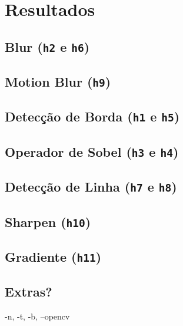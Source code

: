 \section{Resultados}

\subsection{Blur (\texttt{h2} e \texttt{h6})} \label{sec:blur}

    

\subsection{Motion Blur (\texttt{h9})} \label{sec:motion}

    

\subsection{Detecção de Borda (\texttt{h1} e \texttt{h5})} \label{sec:borda}

    

\subsection{Operador de Sobel (\texttt{h3} e \texttt{h4})} \label{sec:sobel}

    

\subsection{Detecção de Linha (\texttt{h7} e \texttt{h8})} \label{sec:linha}

    

\subsection{Sharpen (\texttt{h10})} \label{sec:sharpen}

    

\subsection{Gradiente (\texttt{h11})} \label{sec:grad}

    

\subsection{Extras?}

    -n, -t, -b, --opencv
